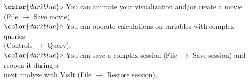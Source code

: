 \documentclass[10pt, hyperref={unicode=true,pdfusetitle, bookmarks=true,bookmarksnumbered=false,bookmarksopen=false, breaklinks=false,pdfborder={0 0 1},backref=true,colorlinks=true,linkcolor=darkblue,pageanchor}]{beamer}
\begin{document}
\begin{frame}
\begin{block}{}
\hspace{1cm} $\color{darkblue}\circ$ {\small{You can animate your visualization and/or create a movie (File $\rightarrow$ Save movie)}}\\

\hspace{1cm} $\color{darkblue}\circ$ {\small{You can operate calculations on variables with complex queries \\
\hspace{1.3cm} (Controls $\rightarrow$ Query),}}\\

\hspace{1cm} $\color{darkblue}\circ$ {\small{You can save a complex session (File $\rightarrow$ Save session) and reopen it during a \\
\hspace{1.3cm} next analyze with VisIt (File $\rightarrow$ Restore session),}}



\end{block}
\end{frame}
\end{document}
